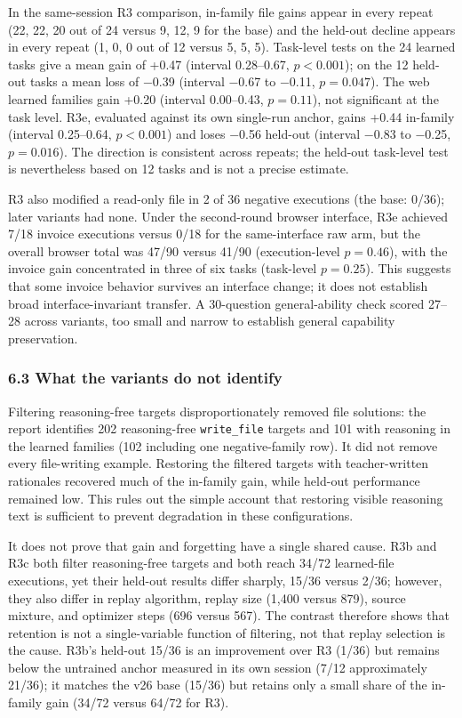 \documentclass[
  10pt,
]{article}
\newcounter{none} %
\begin{document}
In the same-session R3 comparison, in-family file gains appear in every
repeat (22, 22, 20 out of 24 versus 9, 12, 9 for the base) and the
held-out decline appears in every repeat (1, 0, 0 out of 12 versus 5, 5,
5). Task-level tests on the 24 learned tasks give a mean gain of +0.47
(interval 0.28--0.67, \(p<0.001\)); on the 12 held-out tasks a mean loss
of −0.39 (interval −0.67 to −0.11, \(p=0.047\)). The web learned
families gain +0.20 (interval 0.00--0.43, \(p=0.11\)), not significant
at the task level. R3e, evaluated against its own single-run anchor,
gains +0.44 in-family (interval 0.25--0.64, \(p<0.001\)) and loses −0.56
held-out (interval −0.83 to −0.25, \(p=0.016\)). The direction is
consistent across repeats; the held-out task-level test is nevertheless
based on 12 tasks and is not a precise estimate.

R3 also modified a read-only file in 2 of 36 negative executions (the
base: 0/36); later variants had none. Under the second-round browser
interface, R3e achieved 7/18 invoice executions versus 0/18 for the
same-interface raw arm, but the overall browser total was 47/90 versus
41/90 (execution-level \(p=0.46\)), with the invoice gain concentrated
in three of six tasks (task-level \(p=0.25\)). This suggests that some
invoice behavior survives an interface change; it does not establish
broad interface-invariant transfer. A 30-question general-ability check
scored 27--28 across variants, too small and narrow to establish general
capability preservation.

\subsubsection{6.3 What the variants do not
identify}\label{what-the-variants-do-not-identify}

Filtering reasoning-free targets disproportionately removed file
solutions: the report identifies 202 reasoning-free \texttt{write\_file}
targets and 101 with reasoning in the learned families (102 including
one negative-family row). It did not remove every file-writing example.
Restoring the filtered targets with teacher-written rationales recovered
much of the in-family gain, while held-out performance remained low.
This rules out the simple account that restoring visible reasoning text
is sufficient to prevent degradation in these configurations.

It does not prove that gain and forgetting have a single shared cause.
R3b and R3c both filter reasoning-free targets and both reach 34/72
learned-file executions, yet their held-out results differ sharply,
15/36 versus 2/36; however, they also differ in replay algorithm, replay
size (1,400 versus 879), source mixture, and optimizer steps (696 versus
567). The contrast therefore shows that retention is not a
single-variable function of filtering, not that replay selection is the
cause. R3b's held-out 15/36 is an improvement over R3 (1/36) but remains
below the untrained anchor measured in its own session (7/12
approximately 21/36); it matches the v26 base (15/36) but retains only a
small share of the in-family gain (34/72 versus 64/72 for R3).
\end{document}
